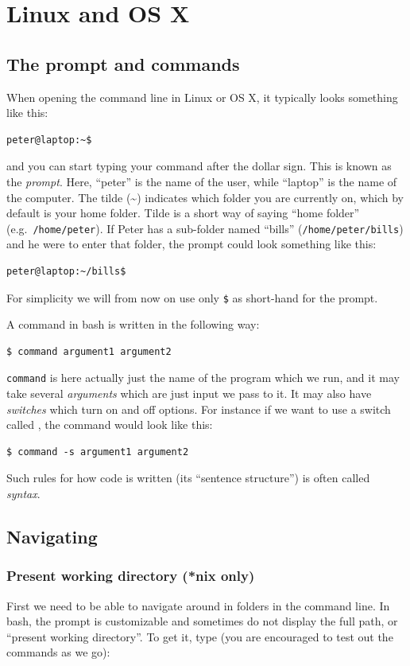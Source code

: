 \section{Linux and OS X}

\subsection{The prompt and commands}
When opening the command line in Linux or OS X, it typically looks something like this:
\begin{verbatim}
peter@laptop:~$
\end{verbatim}
and you can start typing your command after the dollar sign. This is known as the \emph{prompt}. Here, ``peter'' is the name of the user, while ``laptop'' is the name of the computer. The tilde (\~{}) indicates which folder you are currently on, which by default is your home folder. Tilde is a short way of saying ``home folder'' (e.g.\ \verb|/home/peter|). If Peter has a sub-folder named ``bills'' (\verb|/home/peter/bills|) and he were to enter that folder, the prompt could look something like this:
\begin{verbatim}
peter@laptop:~/bills$
\end{verbatim}
For simplicity we will from now on use only \texttt{\$} as short-hand for the prompt.

A command in bash is written in the following way:

\begin{verbatim}
$ command argument1 argument2
\end{verbatim}

\verb|command| is here actually just the name of the program which we run, and it may take several \emph{arguments} which are just input we pass to it. It may also have \emph{switches} which turn on and off options. For instance if we want to use a switch called , the command would look like this:

\begin{verbatim}
$ command -s argument1 argument2
\end{verbatim}
Such rules for how code is written (its ``sentence structure'') is often called \emph{syntax}. 

\subsection{Navigating}
\subsubsection{Present working directory (*nix only)}
First we need to be able to navigate around in folders in the command line. In bash, the prompt is customizable and sometimes do not display the full path, or ``present working directory''. To get it, type (you are encouraged to test out the commands as we go):


